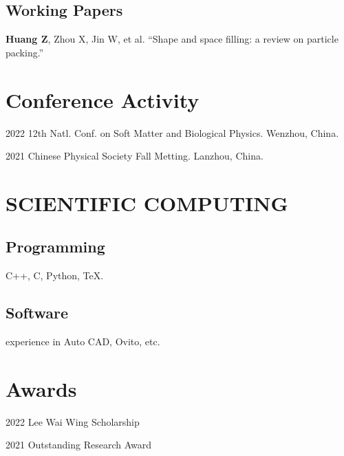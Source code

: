 \documentclass[12pt,letterpaper]{report}
\begin{document}
	\subsection*{Working Papers}
	
	\begin{tablist}
		
		\textbf{Huang Z}, Zhou X, Jin W, et al. \enquote{Shape and space filling: a review on particle packing.}
		
		
	\end{tablist}
	
	\section*{Conference Activity}
	
	\begin{tablist}
		
		\item[2022] \tab{}12th Natl. Conf. on Soft Matter and Biological Physics. Wenzhou, China.
		
		\item[2021] \tab{}Chinese Physical Society Fall Metting. Lanzhou, China.
		
	\end{tablist}
	
	
	
	
	
	\section*{SCIENTIFIC COMPUTING}
	
	\subsection*{ Programming}
	
	\begin{tablist}
		
		C++, C, Python, TeX.
	\end{tablist}
	
	\subsection*{Software}
	
	\begin{tablist}
		
		 experience in Auto CAD, Ovito, etc.
		
	\end{tablist}

	\section*{Awards}
	
	\begin{tablist}
		
		\item[2022] \tab{}Lee Wai Wing Scholarship
		
		\item[2021] \tab{}Outstanding Research Award
		
	\end{tablist}
	
	
	
	
	
\end{document}
